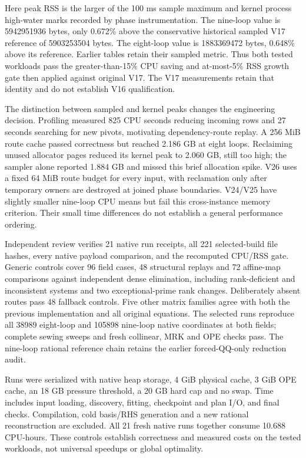 \documentclass[11pt]{article}
\begin{document}
Here peak RSS is the larger of the 100 ms sample maximum and kernel process
high-water marks recorded by phase instrumentation. The nine-loop value
is 5942951936 bytes, only 0.672\% above the conservative historical sampled
V17 reference of 5903253504 bytes. The eight-loop value is 1883369472 bytes,
0.648\% above its reference. Earlier tables retain their sampled metric.
Thus both tested workloads pass the greater-than-15\% CPU saving and
at-most-5\% RSS growth gate then applied against original V17. The V17
measurements retain that identity and do not establish V16 qualification.

The distinction between sampled and kernel peaks changes the engineering
decision. Profiling measured 825 CPU seconds reducing incoming rows and
27 seconds searching for new pivots, motivating dependency-route replay.
A 256 MiB route cache passed correctness but reached 2.186 GB at eight
loops. Reclaiming unused allocator pages reduced its kernel peak to
2.060 GB, still too high; the sampler alone reported 1.884 GB and missed
this brief allocation spike. V26 uses a fixed 64 MiB route budget for every
input, with reclamation only after temporary owners are destroyed at joined
phase boundaries. V24/V25 have slightly smaller nine-loop CPU means but
fail this cross-instance memory criterion. Their small time differences do
not establish a general performance ordering.

Independent review verifies 21 native run receipts, all 221 selected-build
file hashes, every native payload comparison, and the recomputed CPU/RSS
gate. Generic controls cover 96 field cases, 48 structural replays and
72 affine-map comparisons against independent dense elimination, including
rank-deficient and inconsistent systems and two exceptional-prime rank
changes. Deliberately absent routes pass 48 fallback controls. Five other
matrix families agree with both the previous implementation and all original
equations. The selected runs reproduce all 38989 eight-loop and 105898
nine-loop native coordinates at both fields; complete sewing sweeps and
fresh collinear, MRK and OPE checks pass. The nine-loop rational reference
chain retains the earlier forced-QQ-only reduction audit.

Runs were serialized with native heap storage, 4 GiB physical cache,
3 GiB OPE cache, an 18 GB pressure threshold, a 20 GB hard cap and no swap.
Time includes input loading, discovery, fitting, checkpoint and plan I/O,
and final checks. Compilation, cold basis/RHS generation and a new rational
reconstruction are excluded. All 21 fresh native runs together consume
10.688 CPU-hours. These controls establish correctness and measured costs
on the tested workloads, not universal speedups or global optimality.
\end{document}
